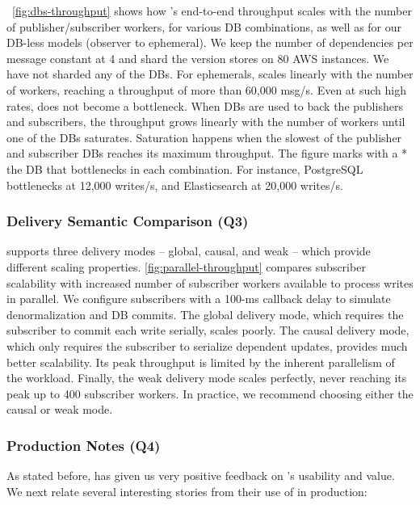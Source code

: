 \F~\ref{fig:dbs-throughput} shows how \synapse's end-to-end throughput scales
with the number of publisher/subscriber workers, for various DB
combinations, as well as for our
DB-less models (observer to ephemeral). We keep the number of dependencies per
message constant at 4 and shard the version stores on 80 AWS instances. We have not sharded
any of the DBs. For ephemerals, \synapse scales linearly with the number of
workers, reaching a throughput of more than 60,000 msg/s. Even at such high
rates, \synapse does not become a bottleneck.  When DBs are used to
back the publishers and subscribers, the throughput grows linearly with the
number of workers until one of the DBs saturates. Saturation happens when the
slowest of the publisher and subscriber DBs reaches its maximum throughput. The
figure marks with a * the DB that bottlenecks in each combination. For
instance, PostgreSQL bottlenecks at 12,000 writes/s, and Elasticsearch at
20,000 writes/s.

\subsubsection{Delivery Semantic Comparison (Q3)}
\label{sec:evaluation:delivery}

\synapse supports three delivery modes -- global, causal, and weak -- which
provide different scaling properties.
\F\ref{fig:parallel-throughput} compares subscriber scalability with 
increased number of subscriber workers available to process writes in parallel.
We configure subscribers with a 100-ms callback delay to simulate
denormalization and DB commits.  The global delivery mode, which requires the
subscriber to commit each write serially, scales poorly.  The causal
delivery mode, which only requires the subscriber to serialize dependent
updates, provides much better scalability.  Its peak throughput is limited by
the inherent parallelism of the workload.  Finally, the weak delivery mode
scales perfectly, never reaching its peak up to 400 subscriber workers.
In practice, we recommend choosing either the causal or weak mode.

\subsubsection{Production Notes (Q4)}
\label{sec:eval:ease-of-use}

As stated before, \crowdtap has given us very positive feedback on \synapse's
usability and value.  We next relate several interesting stories from
their use of \synapse in production:

